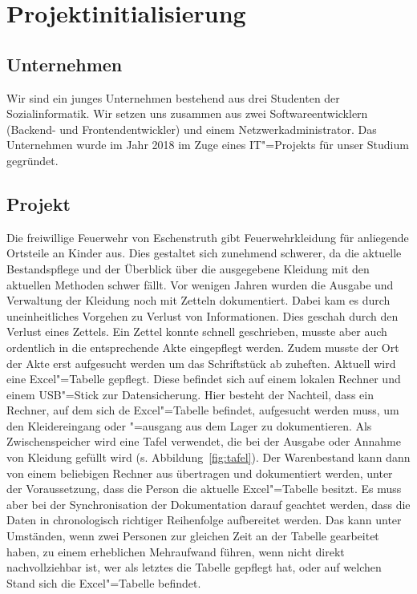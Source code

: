 \section{Projektinitialisierung}\label{sec:Projektinitialisierung}

\subsection{Unternehmen}

Wir sind ein junges Unternehmen bestehend aus drei Studenten der Sozialinformatik. Wir setzen uns zusammen aus zwei Softwareentwicklern (Backend- und Frontendentwickler) und einem Netzwerkadministrator. Das Unternehmen wurde im Jahr 2018 im Zuge eines IT"=Projekts für unser Studium gegründet.


\subsection{Projekt}

Die freiwillige Feuerwehr von Eschenstruth gibt Feuerwehrkleidung für anliegende Ortsteile an Kinder aus. Dies gestaltet sich zunehmend schwerer, da die aktuelle Bestandspflege und der Überblick über die ausgegebene Kleidung mit den aktuellen Methoden schwer fällt. Vor wenigen Jahren wurden die Ausgabe und Verwaltung der Kleidung noch mit Zetteln dokumentiert. Dabei kam es durch uneinheitliches Vorgehen zu Verlust von Informationen. Dies geschah \zb durch den Verlust eines Zettels. Ein Zettel konnte schnell geschrieben, musste aber auch ordentlich in die entsprechende Akte eingepflegt werden. Zudem musste der Ort der Akte erst aufgesucht werden um das Schriftstück ab zuheften. 
Aktuell wird eine Excel"=Tabelle gepflegt. Diese befindet sich auf einem lokalen Rechner und einem USB"=Stick zur Datensicherung. Hier besteht der Nachteil, dass ein Rechner, auf dem sich de Excel"=Tabelle befindet, aufgesucht werden muss, um den Kleidereingang oder "=ausgang aus dem Lager zu dokumentieren. Als Zwischenspeicher wird eine Tafel verwendet, die bei der Ausgabe oder Annahme von Kleidung gefüllt wird (s. Abbildung~\ref{fig:tafel}). Der Warenbestand kann dann von einem beliebigen Rechner aus übertragen und dokumentiert werden, unter der Voraussetzung, dass die Person die aktuelle Excel"=Tabelle besitzt. Es muss aber bei der Synchronisation der Dokumentation darauf geachtet werden, dass die Daten in chronologisch richtiger Reihenfolge aufbereitet werden. Das kann unter Umständen, wenn zwei Personen zur gleichen Zeit an der Tabelle gearbeitet haben, zu einem erheblichen Mehraufwand führen, wenn nicht direkt nachvollziehbar ist, wer als letztes die Tabelle gepflegt hat, oder auf welchen Stand sich die Excel"=Tabelle befindet. 

